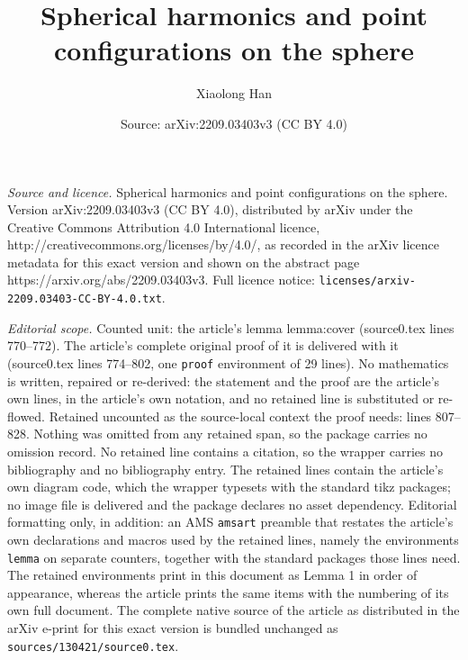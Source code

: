 \documentclass[10pt,a4paper]{amsart}
\title{Spherical harmonics and point configurations on the sphere}
\author{Xiaolong Han}
\date{Source: arXiv:2209.03403v3 (CC BY 4.0)}
\begin{document}
\maketitle

\noindent\emph{Source and licence.} Spherical harmonics and point configurations on the sphere. Version arXiv:2209.03403v3 (CC BY 4.0), distributed by arXiv under the Creative Commons Attribution 4.0 International licence, http://creativecommons.org/licenses/by/4.0/, as recorded in the arXiv licence metadata for this exact version and shown on the abstract page https://arxiv.org/abs/2209.03403v3. Full licence notice: \texttt{licenses/arxiv-2209.03403-CC-BY-4.0.txt}.\par\smallskip

\noindent\textit{Editorial scope.} Counted unit: the article's lemma lemma:cover (source0.tex lines 770--772). The article's complete original proof of it is delivered with it (source0.tex lines 774--802, one \texttt{proof} environment of 29 lines). No mathematics is written, repaired or re-derived: the statement and the proof are the article's own lines, in the article's own notation, and no retained line is substituted or re-flowed.  Retained uncounted as the source-local context the proof needs: lines 807--828.  Nothing was omitted from any retained span, so the package carries no omission record.  No retained line contains a citation, so the wrapper carries no bibliography and no bibliography entry.  The retained lines contain the article's own diagram code, which the wrapper typesets with the standard tikz packages; no image file is delivered and the package declares no asset dependency.  Editorial formatting only, in addition: an AMS \texttt{amsart} preamble that restates the article's own declarations and macros used by the retained lines, namely the environments \texttt{lemma} on separate counters, together with the standard packages those lines need.  The retained environments print in this document as Lemma 1 in order of appearance, whereas the article prints the same items with the numbering of its own full document.  The complete native source of the article as distributed in the arXiv e-print for this exact version is bundled unchanged as \texttt{sources/130421/source0.tex}.
\end{document}
